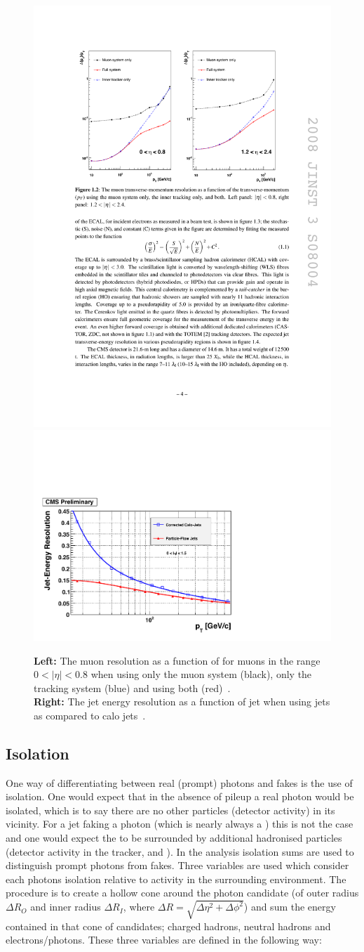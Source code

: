 \begin{figure}
  \includegraphics[height=0.4\textwidth]{ch2_cms_exp/plots/MuonResolution.pdf}
  \includegraphics[height=0.4\textwidth]{ch2_cms_exp/plots/BarrelResolutionPFAndCalo.pdf}
  \caption[Particle flow jet resolution]{\textbf{Left:} The muon \pT resolution as a function of \pT for muons in the range $0<|\eta|<0.8$ when using only the muon system (black), only the tracking system (blue) and using both (red)~\cite{CMS_JINST}. \\ \textbf{Right:} The jet energy resolution as a function of jet \pT when using \PF jets as compared to calo jets~\cite{cms_pf_performance}.}
  \label{fig:muon_jet_res}
\end{figure}

\subsection{Isolation}
\label{sec:iso}

One way of differentiating between real (prompt) photons and fakes is the use of isolation. One would expect that in the absence of pileup a real photon would be isolated, which is to say there are no other particles (detector activity) in its vicinity. For a jet faking a photon (which is nearly always a \pizero) this is not the case and one would expect the \pizero to be surrounded by additional hadronised particles (detector activity in the tracker, \ECAL and \HCAL). In the \CMS \Hgg analysis isolation sums are used to distinguish prompt photons from fakes. Three variables are used which consider each photons isolation relative to activity in the surrounding environment. The procedure is to create a hollow cone around the photon candidate (of outer radius $\Delta R_{O}$ and inner radius $\Delta R_{I}$, where $\Delta R = \sqrt{\Delta\eta^{2}+\Delta\phi^{2}}$) and sum the energy contained in that cone of \PF candidates; charged hadrons, neutral hadrons and electrons/photons. These three variables are defined in the following way:

